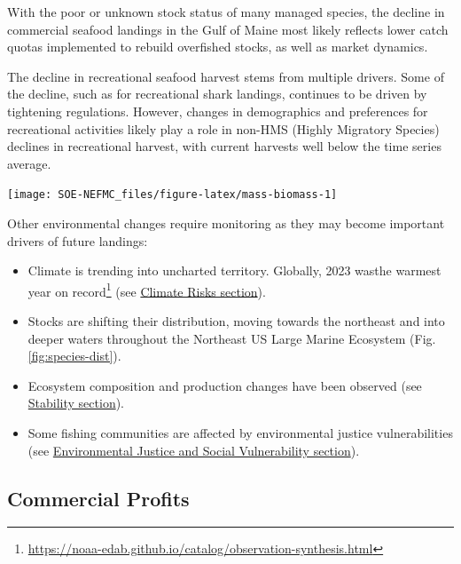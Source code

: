 \documentclass[
  10pt,
]{article}
\providecommand{\tightlist}{%
  \setlength{\itemsep}{0pt}\setlength{\parskip}{0pt}}
\let\origfigure\figure
\let\endorigfigure\endfigure
\renewenvironment{figure}[1][2] {
    \expandafter\origfigure\expandafter[H]
} {
    \endorigfigure
}
\begin{document}
With the poor or unknown stock status of many managed species, the decline in commercial seafood landings in the Gulf of Maine most likely reflects lower catch quotas implemented to rebuild overfished stocks, as well as market dynamics.

The decline in recreational seafood harvest stems from multiple drivers. Some of the decline, such as for recreational shark landings, continues to be driven by tightening regulations. However, changes in demographics and preferences for recreational activities likely play a role in non-HMS (Highly Migratory Species) declines in recreational harvest, with current harvests well below the time series average.

\begin{figure}

{\centering \texttt{[image: SOE-NEFMC\_files/figure-latex/mass-biomass-1]} 

}

\caption{Spring (left) and fall (right) surveyed biomass from the state of Massachusetts inshore survey. The shaded area around each annual mean represents 2 standard deviations from the mean.}\label{fig:mass-biomass}
\end{figure}

Other environmental changes require monitoring as they may become important drivers of future landings:

\begin{itemize}
\tightlist
\item
  Climate is trending into uncharted territory. Globally, 2023 wasthe warmest year on record\footnote{\url{https://noaa-edab.github.io/catalog/observation-synthesis.html}} (see \protect\hyperlink{climate-and-ecosystem-productivity}{Climate Risks section}).
\item
  Stocks are shifting their distribution, moving towards the northeast and into deeper waters throughout the Northeast US Large Marine Ecosystem (Fig. \ref{fig:species-dist}).
\item
  Ecosystem composition and production changes have been observed (see \protect\hyperlink{stability}{Stability section}).
\item
  Some fishing communities are affected by environmental justice vulnerabilities (see \protect\hyperlink{social-vulnerability}{Environmental Justice and Social Vulnerability section}).
\end{itemize}

\newpage

\hypertarget{commercial-profits}{%
\subsection{Commercial Profits}\label{commercial-profits}}
\end{document}
